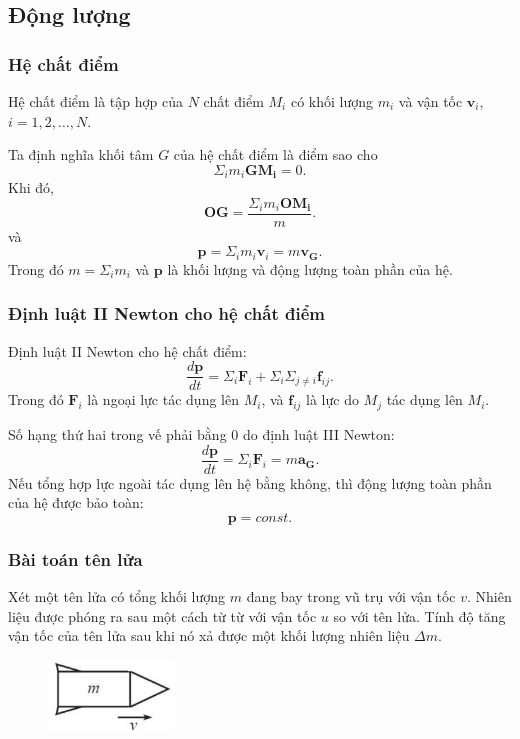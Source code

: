\subsection{Động lượng}
\begin{frame}
    \frametitle{Hệ chất điểm}
    Hệ chất điểm là tập hợp của \(N\) chất điểm \(M_i\) có khối lượng \(m_i\) và vận tốc \(\mathbf{v}_i\), \(i=1,2,\ldots,N\).

    Ta định nghĩa khối tâm \(G\) của hệ chất điểm là điểm sao cho
    \begin{equation}
    \Sigma_i m_i \mathbf{GM_i} = 0.
    \end{equation}
    Khi đó,
    \begin{equation}
    \mathbf{OG} = \frac{\Sigma_i m_i \mathbf{OM_i}}{m}.
    \end{equation}
    và
    \begin{equation}
        \mathbf p=\Sigma_i m_i \mathbf{v}_i = m\mathbf{v_G}.
    \end{equation}
    Trong đó \(m=\Sigma_i m_i\) và \(\mathbf p\) là khối lượng và động lượng toàn phần của hệ.
\end{frame}

\begin{frame}
    \frametitle{Định luật II Newton cho hệ chất điểm}
    Định luật II Newton cho hệ chất điểm:
    \begin{equation}
        \frac{d\mathbf p}{dt} = \Sigma_i \mathbf{F}_i + \Sigma_i \Sigma_{j\neq i} \mathbf{f}_{ij}.
    \end{equation}
    Trong đó \(\mathbf{F}_i\) là ngoại lực tác dụng lên \(M_i\), và \(\mathbf{f}_{ij}\) là lực do \(M_j\) tác dụng lên \(M_i\).

    Số hạng thứ hai trong vế phải bằng 0 do định luật III Newton:
    \begin{equation}
        \frac{d\mathbf p}{dt}=\Sigma_i \mathbf{F}_i=m\mathbf{a_G}.
    \end{equation}
    Nếu tổng hợp lực ngoài tác dụng lên hệ bằng không, thì động lượng toàn phần của hệ được bảo toàn:
        \begin{equation}
            \mathbf p = const.
        \end{equation}
\end{frame}

\begin{frame}
\frametitle{Bài toán tên lửa}
Xét một tên lửa có tổng khối lượng \(m\) đang bay trong vũ trụ với vận tốc \(v\). Nhiên liệu được phóng ra sau một cách từ từ với vận tốc \(u\) so với tên lửa. Tính độ tăng vận tốc của tên lửa sau khi nó xả được một khối lượng nhiên liệu \(\Delta m\).
\vspace{1cm}
\begin{figure}
    \centering
    \includegraphics[width=0.3\textwidth]{Content/Figure/rocket.png}
\end{figure}
\end{frame}

